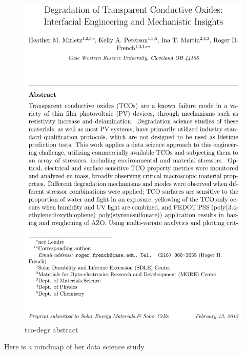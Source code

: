 \documentclass[
]{article}
\begin{document}
\begin{figure}
\centering
\includegraphics{./figs/tco-degr.png}
\caption{tco-degr abstract}
\end{figure}

Here is a mindmap of her data science study
\end{document}
